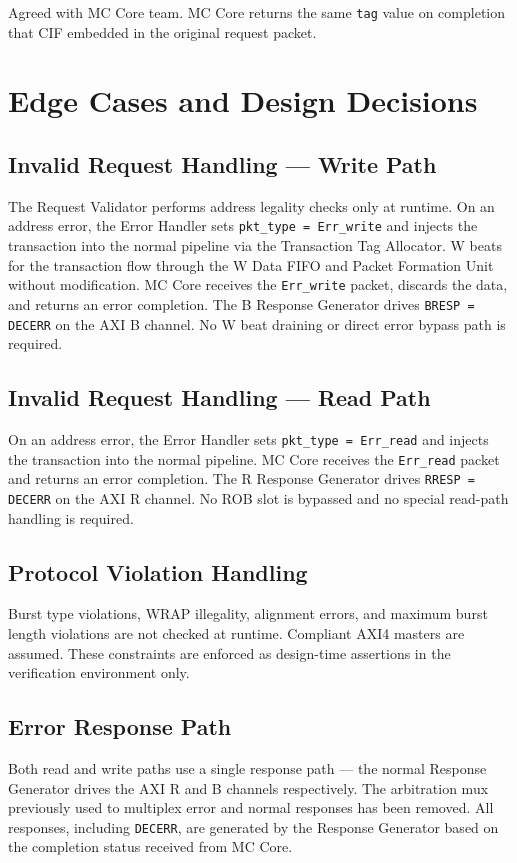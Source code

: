 Agreed with MC Core team. MC Core returns the same \texttt{tag} value on completion that CIF embedded in the original request packet.

\section{Edge Cases and Design Decisions}

\subsection{Invalid Request Handling — Write Path}
The Request Validator performs address legality checks only at runtime. On an address error, the Error Handler sets \texttt{pkt\_type = Err\_write} and injects the transaction into the normal pipeline via the Transaction Tag Allocator. W beats for the transaction flow through the W Data FIFO and Packet Formation Unit without modification. MC Core receives the \texttt{Err\_write} packet, discards the data, and returns an error completion. The B Response Generator drives \texttt{BRESP = DECERR} on the AXI B channel. No W beat draining or direct error bypass path is required.

\subsection{Invalid Request Handling — Read Path}
On an address error, the Error Handler sets \texttt{pkt\_type = Err\_read} and injects the transaction into the normal pipeline. MC Core receives the \texttt{Err\_read} packet and returns an error completion. The R Response Generator drives \texttt{RRESP = DECERR} on the AXI R channel. No ROB slot is bypassed and no special read-path handling is required.

\subsection{Protocol Violation Handling}
Burst type violations, WRAP illegality, alignment errors, and maximum burst length violations are not checked at runtime. Compliant AXI4 masters are assumed. These constraints are enforced as design-time assertions in the verification environment only.

\subsection{Error Response Path}
Both read and write paths use a single response path — the normal Response Generator drives the AXI R and B channels respectively. The arbitration mux previously used to multiplex error and normal responses has been removed. All responses, including \texttt{DECERR}, are generated by the Response Generator based on the completion status received from MC Core.

